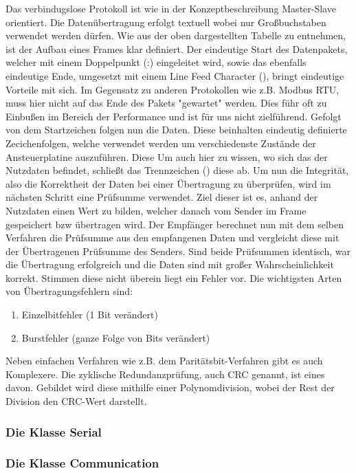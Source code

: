 Das verbindugslose Protokoll ist wie in der Konzeptbeschreibung Master-Slave orientiert. Die Datenübertragung erfolgt textuell wobei nur Großbuchstaben verwendet werden dürfen. \newline
Wie aus der oben dargestellten Tabelle zu entnehmen, ist der Aufbau eines Frames klar definiert. Der eindeutige Start des Datenpakets, welcher mit einem Doppelpunkt (:) eingeleitet wird, sowie das ebenfalls eindeutige Ende, umgesetzt mit einem Line Feed Character (),
bringt eindeutige Vorteile mit sich. Im Gegensatz zu anderen Protokollen wie z.B. Modbus RTU, muss hier nicht auf das Ende des Pakets "gewartet" werden. Dies führ oft zu Einbußen im Bereich der Performance und ist für uns nicht zielführend.\newline
Gefolgt von dem Startzeichen folgen nun die Daten. Diese beinhalten eindeutig definierte Zecichenfolgen, welche verwendet werden um verschiedenste Zustände der Ansteuerplatine auszuführen. Diese Um auch hier zu wissen, wo sich das der Nutzdaten befindet, schließt das Trennzeichen () diese ab.\newline
Um nun die Integrität, also die Korrektheit der Daten bei einer Übertragung zu überprüfen, wird im nächsten Schritt eine Prüfsumme verwendet. Ziel dieser ist es, anhand der Nutzdaten einen Wert zu bilden, welcher danach vom Sender im Frame gespeichert bzw übertragen wird.
Der Empfänger berechnet nun mit dem selben Verfahren die Prüfsumme aus den empfangenen Daten und vergleicht diese mit der Übertragenen Prüfsumme des Senders. Sind beide Prüfsummen identisch, war die Übertragung erfolgreich und die Daten sind mit großer Wahrscheinlichkeit korrekt.
Stimmen diese nicht überein liegt ein Fehler vor. Die wichtigsten Arten von Übertragungsfehlern sind:
\begin{enumerate}
    \item Einzelbitfehler (1 Bit verändert)
    \item Burstfehler (ganze Folge von Bits verändert)
\end{enumerate}
Neben einfachen Verfahren wie z.B. dem Paritätsbit-Verfahren gibt es auch Komplexere. Die zyklische Redundanzprüfung, auch CRC genannt, ist eines davon. Gebildet wird diese mithilfe einer Polynomdivision, wobei der Rest der Division den CRC-Wert darstellt.


\subsubsection{Die Klasse Serial}
\subsubsection{Die Klasse Communication}
